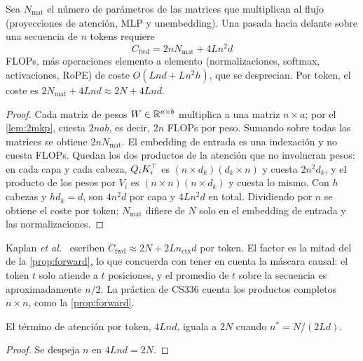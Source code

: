 \begin{proposicion}\label{prop:forward}
Sea $N_{\mathrm{mat}}$ el número de parámetros de las matrices que multiplican al flujo (proyecciones de atención, MLP y unembedding). Una pasada hacia delante sobre una secuencia de $n$ tokens requiere
\[
C_{\mathrm{fwd}}=2nN_{\mathrm{mat}}+4Ln^{2}d
\]
FLOPs, más operaciones elemento a elemento (normalizaciones, softmax, activaciones, RoPE) de coste $O(Lnd+Ln^{2}h)$, que se desprecian. Por token, el coste es $2N_{\mathrm{mat}}+4Lnd\approx 2N+4Lnd$.
\end{proposicion}

\begin{proof}
Cada matriz de pesos $W\in\mathbb{R}^{a\times b}$ multiplica a una matriz $n\times a$; por el \cref{lem:2mkp}, cuesta $2nab$, es decir, $2n$ FLOPs por peso. Sumando sobre todas las matrices se obtiene $2nN_{\mathrm{mat}}$. El embedding de entrada es una indexación y no cuesta FLOPs. Quedan los dos productos de la atención que no involucran pesos: en cada capa y cada cabeza, $Q_iK_i^{\top}$ es $(n\times d_k)(d_k\times n)$ y cuesta $2n^{2}d_k$, y el producto de los pesos por $V_i$ es $(n\times n)(n\times d_k)$ y cuesta lo mismo. Con $h$ cabezas y $hd_k=d$, son $4n^{2}d$ por capa y $4Ln^{2}d$ en total. Dividiendo por $n$ se obtiene el coste por token; $N_{\mathrm{mat}}$ difiere de $N$ solo en el embedding de entrada y las normalizaciones.
\end{proof}

\begin{observacion}
Kaplan \emph{et al.}~\cite[§2.1, ecuación~(2.2)]{kaplan} escriben $C_{\mathrm{fwd}}\approx 2N+2Ln_{\mathrm{ctx}}d$ por token. El factor es la mitad del de la \cref{prop:forward}, lo que concuerda con tener en cuenta la máscara causal: el token $t$ solo atiende a $t$ posiciones, y el promedio de $t$ sobre la secuencia es aproximadamente $n/2$. La práctica de CS336 cuenta los productos completos $n\times n$, como la \cref{prop:forward}.
\end{observacion}

\begin{corolario}\label{cor:nstar}
El término de atención por token, $4Lnd$, iguala a $2N$ cuando $n^{*}=N/(2Ld)$.
\end{corolario}

\begin{proof}
Se despeja $n$ en $4Lnd=2N$.
\end{proof}

